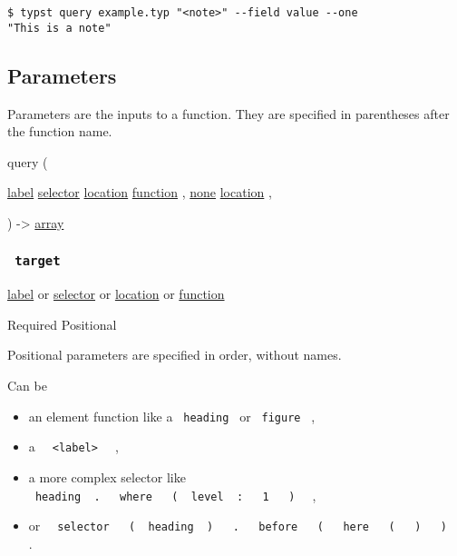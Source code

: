 \begin{verbatim}
$ typst query example.typ "<note>" --field value --one
"This is a note"
\end{verbatim}

\subsection{\texorpdfstring{{ Parameters
}}{ Parameters }}\label{parameters}

\label{parameters-tooltip}
Parameters are the inputs to a function. They are specified in
parentheses after the function name.

{ query } (

{ \href{/docs/reference/foundations/label/}{label}
\href{/docs/reference/foundations/selector/}{selector}
\href{/docs/reference/introspection/location/}{location}
\href{/docs/reference/foundations/function/}{function} , } {
\href{/docs/reference/foundations/none/}{none}
\href{/docs/reference/introspection/location/}{location} , }

) -\textgreater{} \href{/docs/reference/foundations/array/}{array}

\subsubsection{\texorpdfstring{\texttt{\ target\ }}{ target }}\label{parameters-target}

\href{/docs/reference/foundations/label/}{label} {or}
\href{/docs/reference/foundations/selector/}{selector} {or}
\href{/docs/reference/introspection/location/}{location} {or}
\href{/docs/reference/foundations/function/}{function}

{Required} {{ Positional }}

\label{parameters-target-positional-tooltip}
Positional parameters are specified in order, without names.

Can be

\begin{itemize}
\tightlist
\item
  an element function like a \texttt{\ heading\ } or \texttt{\ figure\ }
  ,
\item
  a \texttt{\ }{\texttt{\ \textless{}label\textgreater{}\ }}\texttt{\ }
  ,
\item
  a more complex selector like
  \texttt{\ heading\ }{\texttt{\ .\ }}\texttt{\ }{\texttt{\ where\ }}\texttt{\ }{\texttt{\ (\ }}\texttt{\ level\ }{\texttt{\ :\ }}\texttt{\ }{\texttt{\ 1\ }}\texttt{\ }{\texttt{\ )\ }}\texttt{\ }
  ,
\item
  or
  \texttt{\ }{\texttt{\ selector\ }}\texttt{\ }{\texttt{\ (\ }}\texttt{\ heading\ }{\texttt{\ )\ }}\texttt{\ }{\texttt{\ .\ }}\texttt{\ }{\texttt{\ before\ }}\texttt{\ }{\texttt{\ (\ }}\texttt{\ }{\texttt{\ here\ }}\texttt{\ }{\texttt{\ (\ }}\texttt{\ }{\texttt{\ )\ }}\texttt{\ }{\texttt{\ )\ }}\texttt{\ }
  .
\end{itemize}

